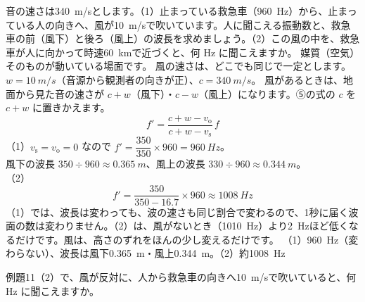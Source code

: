 \label{ph:波-8:ex11}
\begin{phreidai}[風が吹いているとき]
音の速さは\qty{340}{m/s}とします。（1）止まっている救急車（\qty{960}{Hz}）から、止まっている人の向きへ、風が\qty{10}{m/s}で吹いています。人に聞こえる振動数と、救急車の前（風下）と後ろ（風上）の波長を求めましょう。（2）この風の中を、救急車が人に向かって時速\qty{60}{km}で近づくと、何 Hz に聞こえますか。
\phbamen
媒質（空気）そのものが動いている場面です。
\phmushi
風の速さは、どこでも同じで一定とします。
\phzu
$w=\qty{10}{m/s}$（音源から観測者の向きが正）、$c=\qty{340}{m/s}$。
\phriyu
風があるときは、地面から見た音の速さが $c+w$（風下）・$c-w$（風上）になります。⑤の式の $c$ を $c+w$ に置きかえます。
\phtateru
\[f'=\frac{c+w-v_{\mathrm o}}{c+w-v_{\mathrm s}}\,f\]
\phtoku
（1）$v_{\mathrm s}=v_{\mathrm o}=0$ なので $f'=\dfrac{350}{350}\times960=\qty{960}{Hz}$。\\
風下の波長 $350\div960\approx\qty{0.365}{m}$、風上の波長 $330\div960\approx\qty{0.344}{m}$。\\
（2）\[f'=\frac{350}{350-16.7}\times960\approx\qty{1008}{Hz}\]
\phtashikame
（1）では、波長は変わっても、波の速さも同じ割合で変わるので、1秒に届く波面の数は変わりません。（2）は、風がないとき（\qty{1010}{Hz}）より\qty{2}{Hz}ほど低くなるだけです。風は、高さのずれをほんの少し変えるだけです。
\kotae （1）\qty{960}{Hz}（変わらない）、波長は風下\qty{0.365}{m}・風上\qty{0.344}{m}。（2）約\qty{1008}{Hz}
\end{phreidai}
\begin{jibun}
例題11（2）で、風が反対に、人から救急車の向きへ\qty{10}{m/s}で吹いていると、何 Hz に聞こえますか。
\end{jibun}


